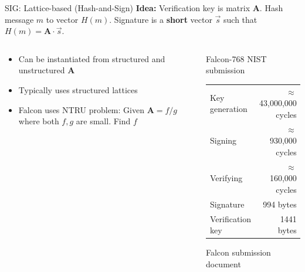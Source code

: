 \documentclass[xcolor=table,10pt,aspectratio=169]{beamer}
\begin{document}
\begin{frame}[label={sec:org1090bdf}]{SIG: Lattice-based (Hash-and-Sign)}
\textbf{Idea:} Verification key is matrix \(\mathbf{A}\). Hash message \(m\) to vector \(H(m)\). Signature is a \textbf{short} vector \(\vec{s}\) such that \(H(m) = \mathbf{A}\cdot \vec{s}\).

\begin{columns}[t]
\begin{column}{0.5\columnwidth}
\begin{itemize}
\item Can be instantiated from structured and unstructured \(\mathbf{A}\)
\item Typically uses structured lattices
\item Falcon uses NTRU problem: Given \(\mathbf{A} = f/g\) where both \(f,g\) are small. Find \(f\)
\end{itemize}
\end{column}

\begin{column}{0.5\columnwidth}
Falcon-768 NIST submission

\begin{center}
\begin{tabular}{lr}
Key generation & \(\approx\) 43,000,000 cycles\\
Signing & \(\approx\)    930,000 cycles\\
Verifying & \(\approx\)    160,000 cycles\\
Signature & 994 bytes\\
Verification key & 1441 bytes\\
\end{tabular}

\end{center}


\small Falcon submission document
\end{column}
\end{columns}
\end{frame}
\end{document}
